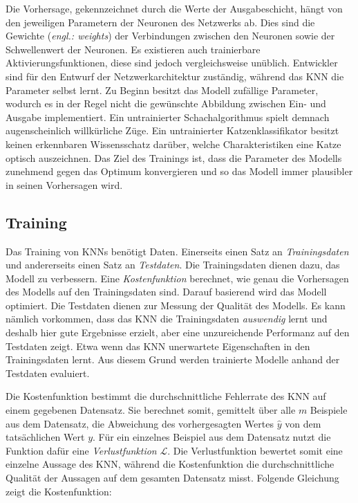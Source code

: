 Die Vorhersage, gekennzeichnet durch die Werte der Ausgabeschicht, hängt von den jeweiligen Parametern der Neuronen des Netzwerks ab. Dies sind die Gewichte (\emph{engl.: weights}) der Verbindungen zwischen den Neuronen sowie der Schwellenwert der Neuronen. Es existieren auch trainierbare Aktivierungsfunktionen, diese sind jedoch vergleichsweise unüblich. Entwickler sind für den Entwurf der Netzwerkarchitektur zuständig, während das \ac{KNN} die Parameter selbst lernt. Zu Beginn besitzt das Modell zufällige Parameter, wodurch es in der Regel nicht die gewünschte Abbildung zwischen Ein- und Ausgabe implementiert. Ein untrainierter Schachalgorithmus spielt demnach augenscheinlich willkürliche Züge. Ein untrainierter Katzenklassifikator besitzt keinen erkennbaren Wissensschatz darüber, welche Charakteristiken eine Katze optisch auszeichnen. Das Ziel des Trainings ist, dass die Parameter des Modells zunehmend gegen das Optimum konvergieren und so das Modell immer plausibler in seinen Vorhersagen wird. \cite{knnsKompakt} \cite{visualApproach}

\subsection{Training}
Das Training von \acp{KNN} benötigt Daten. Einerseits einen Satz an \emph{Trainingsdaten} und andererseits einen Satz an \emph{Testdaten}. Die Trainingsdaten dienen dazu, das Modell zu verbessern. Eine \emph{Kostenfunktion} berechnet, wie genau die Vorhersagen des Modells auf den Trainingsdaten sind. Darauf basierend wird das Modell optimiert. Die Testdaten dienen zur Messung der Qualität des Modells. Es kann nämlich vorkommen, dass das \ac{KNN} die Trainingsdaten \emph{auswendig} lernt und deshalb hier gute Ergebnisse erzielt, aber eine unzureichende Performanz auf den Testdaten zeigt. Etwa wenn das \ac{KNN} unerwartete Eigenschaften in den Trainingsdaten lernt. Aus diesem Grund werden trainierte Modelle anhand der Testdaten evaluiert. \cite{knnsKompakt}

Die Kostenfunktion bestimmt die durchschnittliche Fehlerrate des \ac{KNN} auf einem gegebenen Datensatz. Sie berechnet somit, gemittelt über alle $m$ Beispiele aus dem Datensatz, die Abweichung des vorhergesagten Wertes $\hat{y}$ von dem tatsächlichen Wert $y$. Für ein einzelnes Beispiel aus dem Datensatz nutzt die Funktion dafür eine \emph{Verlustfunktion} $\mathcal{L}$. Die Verlustfunktion bewertet somit eine einzelne Aussage des \ac{KNN}, während die Kostenfunktion die durchschnittliche Qualität der Aussagen auf dem gesamten Datensatz misst. Folgende Gleichung zeigt die Kostenfunktion: \cite{DeepLearningBook}

